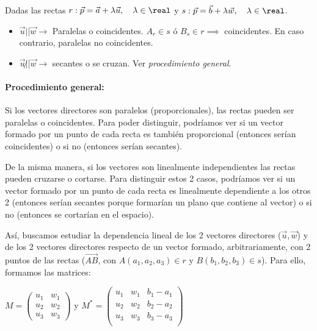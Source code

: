 \begin{framed}
  Dadas las rectas 
$r:\vec{p} = \vec{a} + \lambda\vec{u},\quad \lambda\in\real$
y
$s:\vec{p} = \vec{b} + \lambda\vec{w},\quad \lambda\in\real$. 


\begin{itemize}
    \item $\vec{u}|| \vec{w} \to $ Paralelas o coincidentes.
    \subitem $A_r\in s$ ó $B_s\in r \implies$ coincidentes.
    \subitem En caso contrario, paralelas no coincidentes.
    \item $\vec{u}\not || \vec{w} \to $ secantes o se cruzan.
    \subitem Ver \textit{procedimiento general}.
\end{itemize}
\end{framed}

\paragraph{Procedimiento general:}
\label{txt::procedimiento_general}

Si los vectores directores son paralelos (proporcionales), las rectas pueden ser paralelas o coincidentes. 
%
Para poder distinguir, podríamos ver si un vector formado por un punto de cada recta es también proporcional (entonces serían coincidentes) o si no (entonces serían secantes).

De la misma manera, si los vectores son linealmente independientes las rectas pueden cruzarse o cortarse. 
%
Para distinguir estos 2 casos, podríamos ver si un vector formado por un punto de cada recta es linealmente dependiente a los otros 2 (entonces serían secantes porque formarían un plano que contiene al vector) o si no (entonces se cortarían en el espacio).

Así, buscamos estudiar la dependencia lineal de los 2 vectores directores ($\vec{u},\vec{w}$) y de los 2 vectores directores respecto de un vector formado, arbitrariamente, con 2 puntos de las rectas ($\vec{AB}$, con $A(a_1,a_2,a_3)\in r$ y $B(b_1,b_2,b_3)\in s$). 
%
Para ello, formamos las matrices:

$M  = \displaystyle\begin{pmatrix}
u_1&w_1\\
u_2&w_2\\
u_3&w_3
\end{pmatrix}
$ y 
$M^* = \displaystyle\begin{pmatrix}
u_1&w_1&b_1-a_1\\
u_2&w_2&b_2-a_2\\
u_3&w_3&b_3-a_3\\
\end{pmatrix}
$

